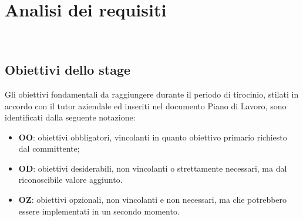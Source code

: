 \chapter{Analisi dei requisiti}
\label{cap:analisi-requisiti}

\\

\section{Obiettivi dello stage}

Gli obiettivi fondamentali da raggiungere durante il periodo di tirocinio, stilati
in accordo con il tutor aziendale ed inseriti nel documento Piano di Lavoro, sono
identificati dalla seguente notazione:
\begin{itemize}
    \item \textbf{OO}: obiettivi obbligatori, vincolanti in quanto obiettivo primario richiesto dal committente;
    \item \textbf{OD}: obiettivi desiderabili, non vincolanti o strettamente necessari, ma dal riconoscibile valore aggiunto.
    \item \textbf{OZ}: obiettivi opzionali, non vincolanti e non necessari, ma che potrebbero essere implementati in un secondo momento.
\end{itemize}

